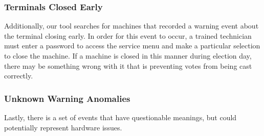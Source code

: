 \subsubsection{Terminals Closed Early}
Additionally, our tool searches for machines that recorded a warning event about the terminal closing early.  In order for this event to occur, a trained technician must enter a password to access the service menu and make a particular selection to close the machine.  If a machine is closed in this manner during election day, there may be something wrong with it that is preventing votes from being cast correctly.  

\subsubsection{Unknown Warning Anomalies}
Lastly, there is a set of events that have questionable meanings, but could potentially represent hardware issues.  
